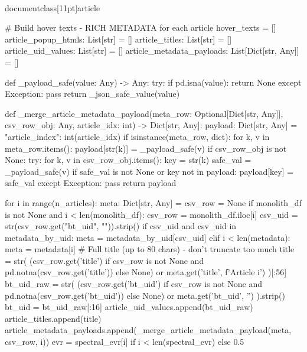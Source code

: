 \\documentclass[11pt]{article}
\begin{document}
\begin{CodeBlock}
{{{{{    # Build hover texts - RICH METADATA for each article
    hover_texts = []
    article_popup_htmls: List[str] = []
    article_titles: List[str] = []
    article_uid_values: List[str] = []
    article_metadata_payloads: List[Dict[str, Any]] = []

    def _payload_safe(value: Any) -> Any:
        try:
            if pd.isna(value):
                return None
        except Exception:
            pass
        return _json_safe_value(value)

    def _merge_article_metadata_payload(meta_row: Optional[Dict[str, Any]], csv_row_obj: Any, article_idx: int) -> Dict[str, Any]:
        payload: Dict[str, Any] = {"article_index": int(article_idx)}
        if isinstance(meta_row, dict):
            for k, v in meta_row.items():
                payload[str(k)] = _payload_safe(v)
        if csv_row_obj is not None:
            try:
                for k, v in csv_row_obj.items():
                    key = str(k)
                    safe_val = _payload_safe(v)
                    if safe_val is not None or key not in payload:
                        payload[key] = safe_val
            except Exception:
                pass
        return payload

    for i in range(n_articles):
        meta: Dict[str, Any] = {}
        csv_row = None
        if monolith_df is not None and i < len(monolith_df):
            csv_row = monolith_df.iloc[i]
            csv_uid = str(csv_row.get("bt_uid", "")).strip()
            if csv_uid and csv_uid in metadata_by_uid:
                meta = metadata_by_uid[csv_uid]
        elif i < len(metadata):
            meta = metadata[i]
        # Full title (up to 80 chars) - don't truncate too much
        title = str(
            (csv_row.get('title') if csv_row is not None and pd.notna(csv_row.get('title')) else None)
            or meta.get('title', f'Article {i}')
        )[:56]
        bt_uid_raw = str(
            (csv_row.get('bt_uid') if csv_row is not None and pd.notna(csv_row.get('bt_uid')) else None)
            or meta.get('bt_uid', '')
        ).strip()
        bt_uid = bt_uid_raw[:16]
        article_uid_values.append(bt_uid_raw)
        article_titles.append(title)
        article_metadata_payloads.append(_merge_article_metadata_payload(meta, csv_row, i))
        evr = spectral_evr[i] if i < len(spectral_evr) else 0.5

}}}}}
\end{CodeBlock}
\end{document}
